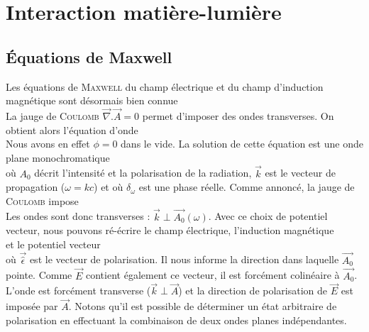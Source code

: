 \chapter{Interaction matière-lumière}
\section{Équations de Maxwell}
Les équations de \textsc{Maxwell} du champ électrique et du champ d'induction magnétique sont 
désormais bien connue
\begin{equation}

\end{equation}
La jauge de \textsc{Coulomb} $\vec\nabla.\vec{A}=0$ permet d'imposer des ondes transverses. On obtient
alors l'équation d'onde
\begin{equation}

\end{equation}
Nous avons en effet $\phi=0$ dans le vide. La solution de cette équation est une onde plane
monochromatique
\begin{equation}

\end{equation}
où $A_0$ décrit l'intensité et la polarisation de la radiation, $\vec{k}$ est le vecteur de 
propagation ($\omega=kc$) et où $\delta_\omega$ est une phase réelle. Comme annoncé, la jauge de
\textsc{Coulomb} impose
\begin{equation}

\end{equation}
Les ondes sont donc transverses : $\vec{k}\perp\vec{A_0}(\omega)$. Avec ce choix de potentiel vecteur,
nous pouvons ré-écrire le champ électrique, l'induction magnétique 
\begin{equation}

\end{equation}
et le potentiel vecteur
\begin{equation}

\end{equation}
où $\vec{\hat{\epsilon}}$ est le vecteur de polarisation. Il nous informe la direction dans laquelle
$\vec{A_0}$ pointe. Comme $\vec{E}$ contient également ce vecteur, il est forcément colinéaire à 
$\vec{A_0}$. L'onde est forcément transverse ($\vec{k}\perp\vec{A}$) et la direction de polarisation
de $\vec{E}$ est imposée par $\vec{A}$. Notons qu'il est possible de déterminer un état arbitraire
de polarisation en effectuant la combinaison de deux ondes planes indépendantes.\\

